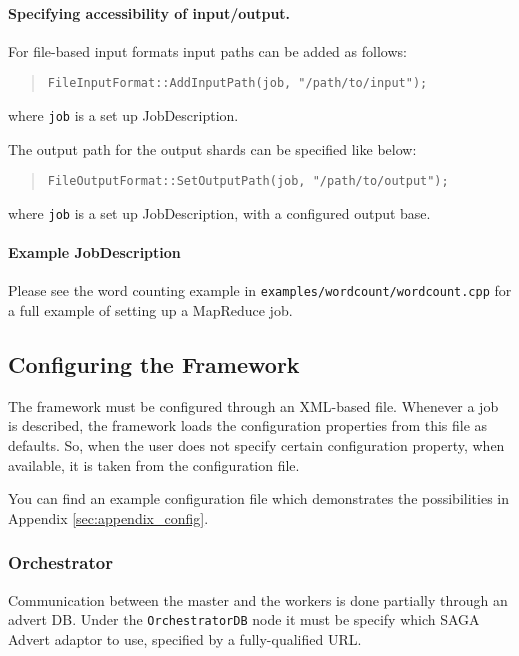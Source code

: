 \documentclass{article}
\begin{document}
\paragraph{Specifying accessibility of input/output.}

For file-based input formats input paths can be added as follows:
\begin{quote}
\begin{verbatim}
FileInputFormat::AddInputPath(job, "/path/to/input");
\end{verbatim}
\end{quote}
where \texttt{job} is a set up JobDescription.

The output path for the output shards can be specified like below:
\begin{quote}
\begin{verbatim}
FileOutputFormat::SetOutputPath(job, "/path/to/output");
\end{verbatim}
\end{quote}
where \texttt{job} is a set up JobDescription, with a configured output base.

\paragraph{Example JobDescription}
Please see the word counting example in \texttt{examples/wordcount/wordcount.cpp} for a full example of setting up a MapReduce job.

\subsection{Configuring the Framework}

The framework must be configured through an XML-based file. Whenever a job is described, the framework loads the configuration properties from this file as defaults. So, when the user does not specify certain configuration property, when available, it is taken from the configuration file.

You can find an example configuration file which demonstrates the possibilities in Appendix \ref{sec:appendix_config}.

\subsubsection{Orchestrator}

Communication between the master and the workers is done partially through an advert DB. Under the \texttt{OrchestratorDB} node it must be specify which SAGA Advert adaptor to use, specified by a fully-qualified URL.
\end{document}
